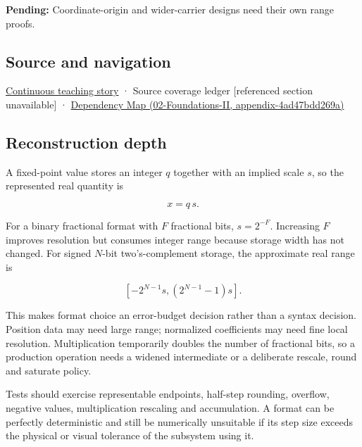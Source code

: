\textbf{Pending:} Coordinate-origin and wider-carrier designs need their own range proofs.

\subsection{Source and navigation}\label{appendix-ceb4c4a9b5a1-source-and-navigation}

\hyperref[01-foundations-i-ch001-choosing-what-information-to-keep]{Continuous teaching story} · {Source coverage ledger {[}referenced section unavailable{]}} · \href{../02-Foundations-II/main.pdf\#nameddest=appendix-4ad47bdd269a}{Dependency Map (02-Foundations-II, appendix-4ad47bdd269a)}

\subsection{Reconstruction depth}\label{appendix-ceb4c4a9b5a1-reconstruction-depth}

A fixed-point value stores an integer \(q\) together with an implied scale \(s\), so the represented real quantity is

\[
x=q\,s.
\]

For a binary fractional format with \(F\) fractional bits, \(s=2^{-F}\). Increasing \(F\) improves resolution but consumes integer range because storage width has not changed. For signed \(N\)-bit two's-complement storage, the approximate real range is

\[
[-2^{N-1}s,(2^{N-1}-1)s].
\]

This makes format choice an error-budget decision rather than a syntax decision. Position data may need large range; normalized coefficients may need fine local resolution. Multiplication temporarily doubles the number of fractional bits, so a production operation needs a widened intermediate or a deliberate rescale, round and saturate policy.

Tests should exercise representable endpoints, half-step rounding, overflow, negative values, multiplication rescaling and accumulation. A format can be perfectly deterministic and still be numerically unsuitable if its step size exceeds the physical or visual tolerance of the subsystem using it.
